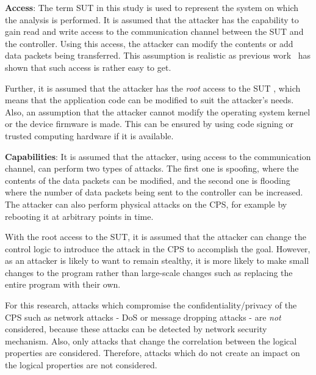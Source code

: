 {\bf Access}: The term \ac{SUT} in this study is used to represent the system on which the analysis is performed. It is assumed that the attacker has the capability to gain read and write access to the communication channel between the \ac{SUT} and the controller. Using this access, the attacker can modify the contents or add data packets being transferred. This assumption is realistic as previous work~\cite{ericsson2010cyber} has shown that such access is rather easy to get.

Further, it is assumed that the attacker has the \textit{root} access to the \ac{SUT} \cite{alemzadeh2016targeted}, which means that the application code can be modified to suit the attacker's needs. Also, an assumption that the attacker cannot modify the operating system kernel or the device firmware is made. This can be ensured by using code signing or trusted computing hardware if it is available. 

{\bf Capabilities}: It is assumed that the attacker, using access to the communication channel, can perform two types of attacks. The first one is spoofing, where the contents of the data packets can be modified, and the second one is flooding where the number of data packets being sent to the controller can be increased. The attacker can also perform physical attacks on the \ac{CPS}, for example by rebooting it at arbitrary points in time. 

With the root access to the \ac{SUT}, it is assumed that the attacker can change the control logic to introduce the attack in the \ac{CPS} to accomplish the goal. However, as an attacker is likely to want to remain stealthy, it is more likely to make small changes to the program rather than large-scale changes such as replacing the entire program with their own. 
 
For this research, attacks which compromise the confidentiality/privacy of the \ac{CPS} such as network attacks - \ac{DoS} or message dropping attacks - are \textit{not} considered, because these attacks can be detected by network security mechanism. Also, only attacks that change the correlation between the logical properties are considered. Therefore, attacks which do not create an impact on the logical properties are not considered. 

